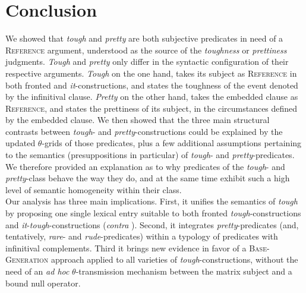 \documentclass[11pt]{article}
\begin{document}
\section*{Conclusion}
	We showed that \textit{tough} and \textit{pretty} are both subjective predicates in need of a \textsc{Reference} argument, understood as the source of the \textit{toughness} or \textit{prettiness} judgments.
	\textit{Tough} and \textit{pretty} only differ in the syntactic configuration of their respective arguments. \textit{Tough} on the one hand, takes its subject as \textsc{Reference} in both fronted and \textit{it}-constructions, and states the toughness of the event denoted by the infinitival clause. \textit{Pretty} on the other hand, takes the embedded clause as \textsc{Reference}, and states the prettiness of its subject, in the circumstances defined by the embedded clause. We then showed that the three main structural contrasts between \textit{tough}- and \textit{pretty}-constructions could be explained by the updated $\theta$-grids of those predicates, plus a few additional assumptions pertaining to the semantics (presuppositions in particular) of \textit{tough}- and \textit{pretty}-predicates. We therefore provided an explanation as to why predicates of the \textit{tough}- and \textit{pretty}-class behave the way they do, and at the same time exhibit such a high level of semantic homogeneity within their class.\\
	
	Our analysis has three main implications. First, it unifies the semantics of \textit{tough} by proposing one single lexical entry suitable to both fronted \textit{tough}-constructions and \textit{it}-\textit{tough}-constructions (\textit{contra} \cite{Keine2017}). Second, it integrates \textit{pretty}-predicates (and, tentatively, \textit{rare}- and \textit{rude}-predicates) within a typology of predicates with infinitival complements. Third it brings new evidence in favor of a \textsc{Base-Generation} approach applied to all varieties of \textit{tough}-constructions, without the need of an \textit{ad hoc} $\theta$-transmission mechanism between the matrix subject and a bound null operator.


	

	
	
	\iffalse
	Alsop: brave predicates Mary is brave to tell the truth. John was rude to ask Mary about her thesis. Restriction of the judgement to the particular event. Just like pretty. Mary-telling-the-truth cause a brave jusgement about Mary.
	\fi
\newpage


\end{document}
